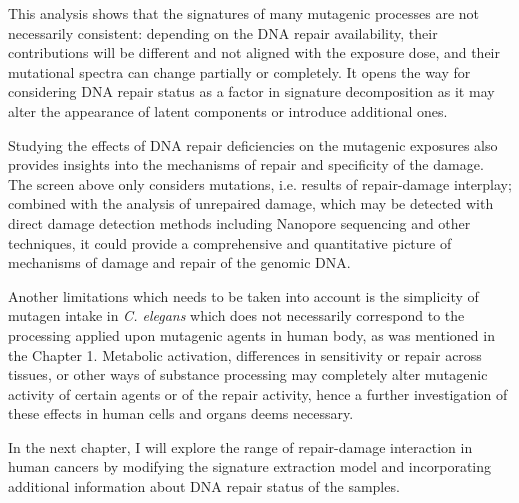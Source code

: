 This analysis shows that the signatures of many mutagenic processes are not necessarily
consistent: depending on the DNA repair availability, their contributions will be different
and not aligned with the exposure dose, and their mutational spectra can change partially or
completely. It opens the way for considering DNA repair status as a factor in signature
decomposition as it may alter the appearance of latent components or introduce additional ones.

Studying the effects of DNA repair deficiencies on the mutagenic exposures also provides
insights into the mechanisms of repair and specificity of the damage. The screen above only
considers mutations, i.e. results of repair-damage interplay; combined with the analysis
of unrepaired damage, which may be detected with direct damage detection methods including
Nanopore sequencing and other techniques, it could provide a comprehensive and quantitative
picture of mechanisms of damage and repair of the genomic DNA.

Another limitations which needs to be taken into account is the simplicity of mutagen intake
in \textit{C. elegans} which does not necessarily correspond to the processing applied upon 
mutagenic agents in human body, as was mentioned in the Chapter 1. Metabolic activation, 
differences in sensitivity or repair across tissues, or other ways of substance 
processing may completely alter mutagenic activity of certain agents or of the repair activity,
hence a further investigation of these effects in human cells and organs deems necessary.

In the next chapter, I will explore the range of repair-damage interaction in human
cancers by modifying the signature extraction model and incorporating additional information
about DNA repair status of the samples.







